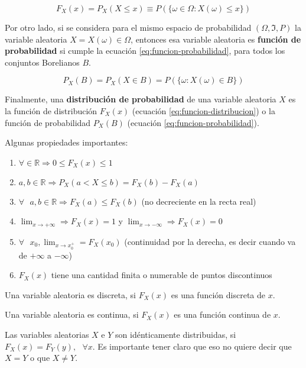 \documentclass[]{article}
\providecommand{\tightlist}{%
  \setlength{\itemsep}{0pt}\setlength{\parskip}{0pt}}
\begin{document}
\begin{equation}
F_X(x) = P_X(X \leq x) \equiv P(\{\omega \in \Omega: X(\omega) \leq x \}) 
\label{eq:funcion-distribucion}
\end{equation}

Por otro lado, si se considera para el mismo espacio de probabilidad
\((\Omega, \Im, P)\) la variable aleatoria \(X = X(\omega) \in \Omega\),
entonces esa variable aleatoria es \textbf{función de probabilidad} si
cumple la ecuación \eqref{eq:funcion-probabilidad}, para todos los
conjuntos Borelianos \(B\).

\begin{equation}
P_X(B) = P_X(X \in B) = P(\{\omega : X(\omega) \in B\})
\label{eq:funcion-probabilidad}
\end{equation}

Finalmente, una \textbf{distribución de probabilidad} de una variable
aleatoria \(X\) es la función de distribución \(F_X(x)\) (ecuación
\eqref{eq:funcion-distribucion}) o la función de probabilidad \(P_X(B)\)
(ecuación \eqref{eq:funcion-probabilidad}).

Algunas propiedades importantes:

\begin{enumerate}
\def\labelenumi{\arabic{enumi}.}
\tightlist
\item
  \(\forall \in \mathbb{R} \Rightarrow 0 \leq F_X(x) \leq 1\)
\item
  \(a, b \in \mathbb{R} \Rightarrow P_X(a < X \leq b) = F_X(b) - F_X(a)\)
\item
  \(\forall \text{ } a, b \in \mathbb{R} \Rightarrow F_X(a) \leq F_X(b)\)
  (no decreciente en la recta real)
\item
  \(\lim_{x \rightarrow + \infty} \Rightarrow F_X(x) = 1\) y
  \(\lim_{x \rightarrow - \infty} \Rightarrow F_X(x) = 0\)
\item
  \(\forall \text{ } x_0, \lim_{x \rightarrow x_0^+} = F_X(x_0)\)
  (continuidad por la derecha, es decir cuando va de \(+\infty\) a
  \(-\infty\))
\item
  \(F_X(x)\) tiene una cantidad finita o numerable de puntos
  discontinuos
\end{enumerate}

Una variable aleatoria es discreta, si \(F_X(x)\) es una función
discreta de \(x\).

Una variable aleatoria es continua, si \(F_X(x)\) es una función
continua de \(x\).

Las variables aleatorias \(X\) e \(Y\) son idénticamente distribuidas,
si \(F_X(x) = F_Y(y), \text{ } \forall x\). Es importante tener claro
que eso no quiere decir que \(X=Y\) o que \(X \neq Y\).
\end{document}
